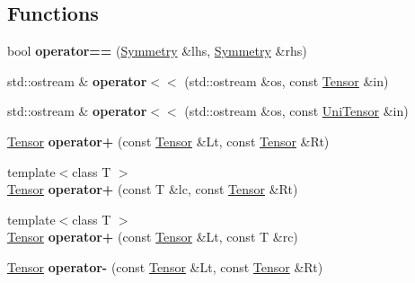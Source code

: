 \subsection*{Functions}
\begin{DoxyCompactItemize}
\item 
\mbox{\label{namespacecytnx_a4c0d42bf5c421b1bc5e9569b857b8d27}} 
bool {\bfseries operator==} (\hyperlink{classcytnx_1_1Symmetry}{Symmetry} \&lhs, \hyperlink{classcytnx_1_1Symmetry}{Symmetry} \&rhs)
\item 
\mbox{\label{namespacecytnx_a651e9fae9c180966bc3655999e473a78}} 
std\+::ostream \& {\bfseries operator$<$$<$} (std\+::ostream \&os, const \hyperlink{classcytnx_1_1Tensor}{Tensor} \&in)
\item 
\mbox{\label{namespacecytnx_a82ae0f76259f95cfe10256e8c3454921}} 
std\+::ostream \& {\bfseries operator$<$$<$} (std\+::ostream \&os, const \hyperlink{classcytnx_1_1UniTensor}{Uni\+Tensor} \&in)
\item 
\mbox{\label{namespacecytnx_a067e7063e7cc7a80c9c91d8998ab7134}} 
\hyperlink{classcytnx_1_1Tensor}{Tensor} {\bfseries operator+} (const \hyperlink{classcytnx_1_1Tensor}{Tensor} \&Lt, const \hyperlink{classcytnx_1_1Tensor}{Tensor} \&Rt)
\item 
\mbox{\label{namespacecytnx_a75a3787e9b9565f0bc90d19453d1ffa5}} 
{\footnotesize template$<$class T $>$ }\\\hyperlink{classcytnx_1_1Tensor}{Tensor} {\bfseries operator+} (const T \&lc, const \hyperlink{classcytnx_1_1Tensor}{Tensor} \&Rt)
\item 
\mbox{\label{namespacecytnx_a9b46a4945621a40fc5e23bbea0576b1a}} 
{\footnotesize template$<$class T $>$ }\\\hyperlink{classcytnx_1_1Tensor}{Tensor} {\bfseries operator+} (const \hyperlink{classcytnx_1_1Tensor}{Tensor} \&Lt, const T \&rc)
\item 
\mbox{\label{namespacecytnx_a5a476408cdb97a10fa2330a5d6b4934c}} 
\hyperlink{classcytnx_1_1Tensor}{Tensor} {\bfseries operator-\/} (const \hyperlink{classcytnx_1_1Tensor}{Tensor} \&Lt, const \hyperlink{classcytnx_1_1Tensor}{Tensor} \&Rt)

\end{DoxyCompactItemize}
